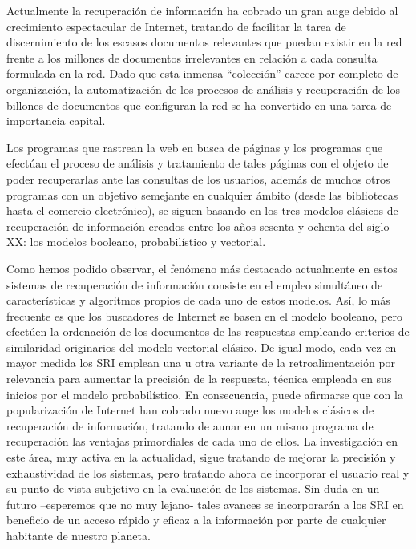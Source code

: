 \documentclass{article}
\begin{document}
Actualmente la recuperación de información ha cobrado un gran auge debido al crecimiento espectacular de Internet, tratando de facilitar la tarea de discernimiento de los escasos documentos relevantes que puedan existir en la red frente a los millones de documentos irrelevantes en relación a cada consulta formulada en la red. Dado que esta inmensa “colección” carece por completo de organización, la automatización de los procesos de análisis y recuperación de los billones de documentos que configuran la red se ha convertido en una tarea de importancia capital.

Los programas que rastrean la web en busca de páginas y los programas que efectúan el proceso de análisis y tratamiento de tales páginas con el objeto de poder recuperarlas ante las consultas de los usuarios, además de muchos otros programas con un objetivo semejante en cualquier ámbito (desde las bibliotecas hasta el comercio electrónico), se siguen basando en los tres modelos clásicos de recuperación de información creados entre los años sesenta y ochenta del siglo XX: los modelos booleano, probabilístico y vectorial. 

Como hemos podido observar, el fenómeno más destacado actualmente en estos sistemas de recuperación de información consiste en el empleo simultáneo de características y algoritmos propios de cada uno de estos modelos. Así, lo más frecuente es que los buscadores de Internet se basen en el modelo booleano, pero efectúen la ordenación de los documentos de las respuestas empleando criterios de similaridad originarios del modelo vectorial clásico. De igual modo, cada vez en mayor medida los SRI emplean una u otra variante de la retroalimentación por relevancia para aumentar la precisión de la respuesta, técnica empleada en sus inicios por el modelo probabilístico.
En consecuencia, puede afirmarse que con la popularización de Internet han cobrado nuevo auge los modelos clásicos de recuperación de información, tratando de aunar en un mismo programa de recuperación las ventajas primordiales de cada uno de ellos. La investigación en este área, muy activa en la actualidad, sigue tratando de mejorar la precisión y exhaustividad de los sistemas, pero tratando ahora de incorporar el usuario real y su punto de vista subjetivo en la evaluación de los sistemas. Sin duda en un futuro –esperemos que no muy lejano- tales avances se incorporarán a los SRI en beneficio de un acceso rápido y eficaz a la información por parte de cualquier habitante de nuestro planeta.
\end{document}
